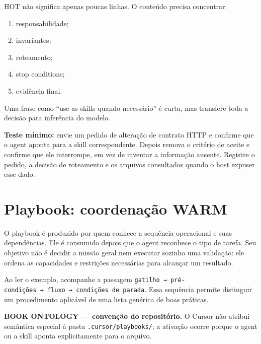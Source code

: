 \documentclass[
  10pt,
  a4paper,
  oneside]{book}
\providecommand{\tightlist}{%
  \setlength{\itemsep}{0pt}\setlength{\parskip}{0pt}}
\begin{document}
HOT não significa apenas poucas linhas. O conteúdo precisa concentrar:

\begin{enumerate}
\def\labelenumi{\arabic{enumi}.}
\tightlist
\item
  responsabilidade;
\item
  invariantes;
\item
  roteamento;
\item
  stop conditions;
\item
  evidência final.
\end{enumerate}

Uma frase como ``use as skills quando necessário'' é curta, mas
transfere toda a decisão para inferência do modelo.

\textbf{Teste mínimo:} envie um pedido de alteração de contrato HTTP e
confirme que o agent aponta para a skill correspondente. Depois remova o
critério de aceite e confirme que ele interrompe, em vez de inventar a
informação ausente. Registre o pedido, a decisão de roteamento e os
arquivos consultados quando o host expuser esse dado.

\hypertarget{playbook-coordenauxe7uxe3o-warm}{%
\section{Playbook: coordenação
WARM}\label{playbook-coordenauxe7uxe3o-warm}}

O playbook é produzido por quem conhece a sequência operacional e suas
dependências. Ele é consumido depois que o agent reconhece o tipo de
tarefa. Seu objetivo não é decidir a missão geral nem executar sozinho
uma validação: ele ordena as capacidades e restrições necessárias para
alcançar um resultado.

Ao ler o exemplo, acompanhe a passagem
\texttt{gatilho\ →\ pré-condições\ →\ fluxo\ →\ condições\ de\ parada}.
Essa sequência permite distinguir um procedimento aplicável de uma lista
genérica de boas práticas.

\textbf{BOOK ONTOLOGY --- convenção do repositório.} O Cursor não
atribui semântica especial à pasta \texttt{.cursor/playbooks/}; a
ativação ocorre porque o agent ou a skill aponta explicitamente para o
arquivo.
\end{document}
